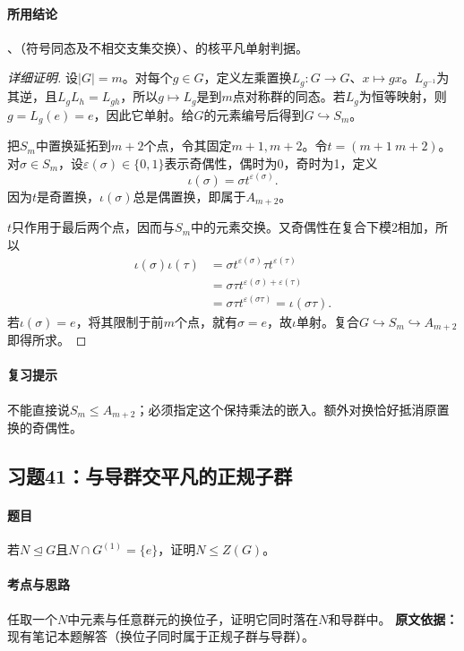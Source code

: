 \paragraph{所用结论}、（符号同态及不相交支集交换）、的核平凡单射判据。
\begin{proof}[详细证明]
设$|G|=m$。对每个$g\in G$，定义左乘置换$L_g:G\to G$、$x\mapsto gx$。$L_{g^{-1}}$为其逆，且$L_gL_h=L_{gh}$，所以$g\mapsto L_g$是到$m$点对称群的同态。若$L_g$为恒等映射，则$g=L_g(e)=e$，因此它单射。给$G$的元素编号后得到$G\hookrightarrow S_m$。

把$S_m$中置换延拓到$m+2$个点，令其固定$m+1,m+2$。令$t=(m+1\ m+2)$。对$\sigma\in S_m$，设$\varepsilon(\sigma)\in\{0,1\}$表示奇偶性，偶时为0，奇时为1，定义
\[
\iota(\sigma)=\sigma t^{\varepsilon(\sigma)}.
\]
因为$t$是奇置换，$\iota(\sigma)$总是偶置换，即属于$A_{m+2}$。

$t$只作用于最后两个点，因而与$S_m$中的元素交换。又奇偶性在复合下模2相加，所以
\begin{align*}
\iota(\sigma)\iota(\tau)
&=\sigma t^{\varepsilon(\sigma)}\tau t^{\varepsilon(\tau)}\\
&=\sigma\tau t^{\varepsilon(\sigma)+\varepsilon(\tau)}\\
&=\sigma\tau t^{\varepsilon(\sigma\tau)}
=\iota(\sigma\tau).
\end{align*}
若$\iota(\sigma)=e$，将其限制于前$m$个点，就有$\sigma=e$，故$\iota$单射。复合$G\hookrightarrow S_m\hookrightarrow A_{m+2}$即得所求。
\end{proof}
\paragraph{复习提示}不能直接说$S_m\le A_{m+2}$；必须指定这个保持乘法的嵌入。额外对换恰好抵消原置换的奇偶性。

\subsection{习题41：与导群交平凡的正规子群}
\paragraph{题目}若$N\trianglelefteq G$且$N\cap G^{(1)}=\{e\}$，证明$N\le Z(G)$。
\paragraph{考点与思路}任取一个$N$中元素与任意群元的换位子，证明它同时落在$N$和导群中。
\textbf{原文依据：}现有笔记本题解答（换位子同时属于正规子群与导群）。
